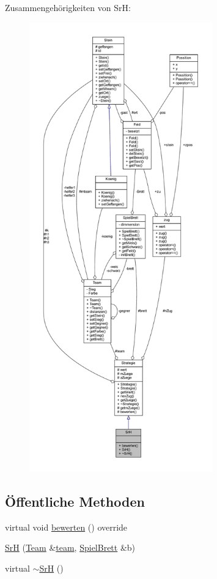 Zusammengehörigkeiten von Sr\+H\+:\nopagebreak
\begin{figure}[H]
\begin{center}
\leavevmode
\includegraphics[height=550pt]{class_sr_h__coll__graph}
\end{center}
\end{figure}
\subsection*{Öffentliche Methoden}
\begin{DoxyCompactItemize}
\item 
virtual void \hyperlink{class_sr_h_a55d77665881d6810fbde7d761ecbb02c}{bewerten} () override
\item 
\hyperlink{class_sr_h_a82cf641600edd8043d09c03478fac61e}{Sr\+H} (\hyperlink{class_team}{Team} \&\hyperlink{class_strategie_a4f55e74f189ec8c6df88a57119fb3def}{team}, \hyperlink{class_spiel_brett}{Spiel\+Brett} \&b)
\item 
virtual \hyperlink{class_sr_h_ac7f7f95344ee9e1517f8f5dcb515cc40}{$\sim$\+Sr\+H} ()
\end{DoxyCompactItemize}
